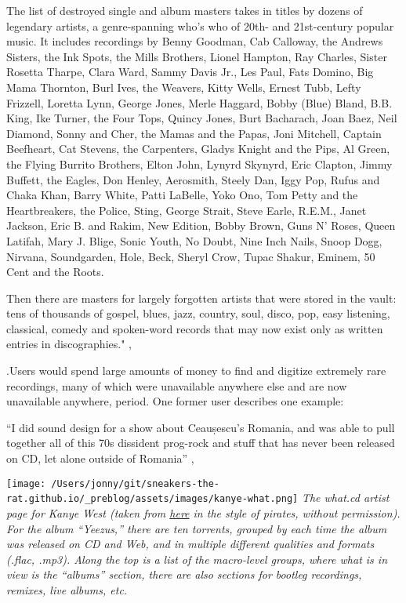 \documentclass{article}
\begin{document}
{\begin{leftbar}
  The list of destroyed single and album masters takes in titles by
  dozens of legendary artists, a genre-spanning who's who of 20th- and
  21st-century popular music. It includes recordings by Benny Goodman,
  Cab Calloway, the Andrews Sisters, the Ink Spots, the Mills Brothers,
  Lionel Hampton, Ray Charles, Sister Rosetta Tharpe, Clara Ward, Sammy
  Davis Jr., Les Paul, Fats Domino, Big Mama Thornton, Burl Ives, the
  Weavers, Kitty Wells, Ernest Tubb, Lefty Frizzell, Loretta Lynn,
  George Jones, Merle Haggard, Bobby (Blue) Bland, B.B. King, Ike
  Turner, the Four Tops, Quincy Jones, Burt Bacharach, Joan Baez, Neil
  Diamond, Sonny and Cher, the Mamas and the Papas, Joni Mitchell,
  Captain Beefheart, Cat Stevens, the Carpenters, Gladys Knight and the
  Pips, Al Green, the Flying Burrito Brothers, Elton John, Lynyrd
  Skynyrd, Eric Clapton, Jimmy Buffett, the Eagles, Don Henley,
  Aerosmith, Steely Dan, Iggy Pop, Rufus and Chaka Khan, Barry White,
  Patti LaBelle, Yoko Ono, Tom Petty and the Heartbreakers, the Police,
  Sting, George Strait, Steve Earle, R.E.M., Janet Jackson, Eric B. and
  Rakim, New Edition, Bobby Brown, Guns N' Roses, Queen Latifah, Mary J.
  Blige, Sonic Youth, No Doubt, Nine Inch Nails, Snoop Dogg, Nirvana,
  Soundgarden, Hole, Beck, Sheryl Crow, Tupac Shakur, Eminem, 50 Cent
  and the Roots.

  Then there are masters for largely forgotten artists that were stored
  in the vault: tens of thousands of gospel, blues, jazz, country, soul,
  disco, pop, easy listening, classical, comedy and spoken-word records
  that may now exist only as written entries in discographies." \cite{rosenDayMusicBurned2019},\end{leftbar}}.Users would spend large amounts of money to find and
digitize extremely rare recordings, many of which were unavailable
anywhere else and are now unavailable anywhere, period. One former user
describes one example:

\begin{leftbar}
``I did sound design for a show about Ceaușescu's Romania, and was able
to pull together all of this 70s dissident prog-rock and stuff that has
never been released on CD, let alone outside of Romania'' \cite{sonnadEulogyWhatCd2016},\end{leftbar}
\texttt{[image: /Users/jonny/git/sneakers-the-rat.github.io/\_preblog/assets/images/kanye-what.png]} \emph{The what.cd
artist page for Kanye West (taken from
\href{https://qz.com/840661/what-cd-is-gone-a-eulogy-for-the-greatest-music-collection-in-the-world/}{here}
in the style of pirates, without permission). For the album ``Yeezus,''
there are ten torrents, grouped by each time the album was released on
CD and Web, and in multiple different qualities and formats (.flac,
.mp3). Along the top is a list of the macro-level groups, where what is
in view is the ``albums'' section, there are also sections for bootleg
recordings, remixes, live albums, etc.}
\end{document}
